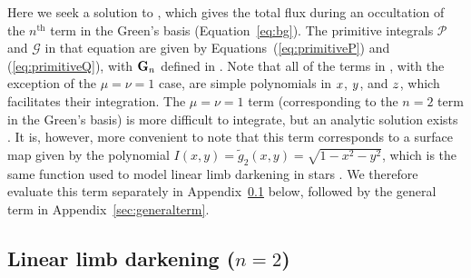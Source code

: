 \documentclass[modern]{aastex61}
\begin{document}
Here we seek a solution to , which gives the total flux
during an occultation of the $n^\mathrm{th}$ term in the Green's basis
(Equation~\ref{eq:bg}). The primitive integrals $\mathcal{P}$ and
$\mathcal{G}$ in that equation are given by Equations~(\ref{eq:primitiveP})
and (\ref{eq:primitiveQ}), with
${\mathbf{G}}_n$ defined in . Note that all of the terms in ,
with the exception of the $\mu = \nu = 1$ case, are simple polynomials
in $\mbox{$x$}$, $\mbox{$y$}$, and $\mbox{$z$}$, which facilitates their integration.
The $\mu = \nu = 1$ term (corresponding to the $n = 2$ term in the Green's basis)
is more difficult to integrate, but an analytic
solution exists \citep{Pal2012}. It is, however, more convenient
to note that this term corresponds to a surface map given by the polynomial
$I(x, y) = \tilde{g}_2(x, y) = \sqrt{1 - x^2 - y^2}$, which is the same function used
to model linear limb darkening in stars \citep{MandelAgol2002}. We therefore
evaluate this term separately in Appendix~\ref{sec:linearld} below, followed by
the general term in Appendix~\ref{sec:generalterm}.

\subsection{Linear limb darkening ($n = 2$)}
\label{sec:linearld}
\end{document}
